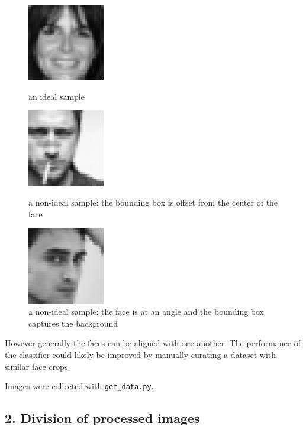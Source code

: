 \documentclass[]{article}
\begin{document}
\begin{figure}[h!]
\begin{centering}
    \begin{multicols}{3}
    \includegraphics[width=0.3\textwidth]{angie-harmon-perfect.jpg}
    \caption{an ideal sample}
    \vfill
    \includegraphics[width=0.3\textwidth]{gerard-butler-noncentered.jpg}
    \caption{a non-ideal sample: the bounding box is offset from the center
             of the face}
    \vfill
    \includegraphics[width=0.3\textwidth]{daniel-radcliffe-angled.jpg}
    \caption{a non-ideal sample: the face is at an angle and the bounding
             box captures the background}
    \end{multicols}
\end{centering}
\end{figure}

However generally the faces can be aligned with one another. The
performance of the classifier could likely be improved by manually
curating a dataset with similar face crops.

Images were collected with \texttt{get\_data.py}.

\subsection{2. Division of processed
images}\label{division-of-processed-images}
\end{document}
